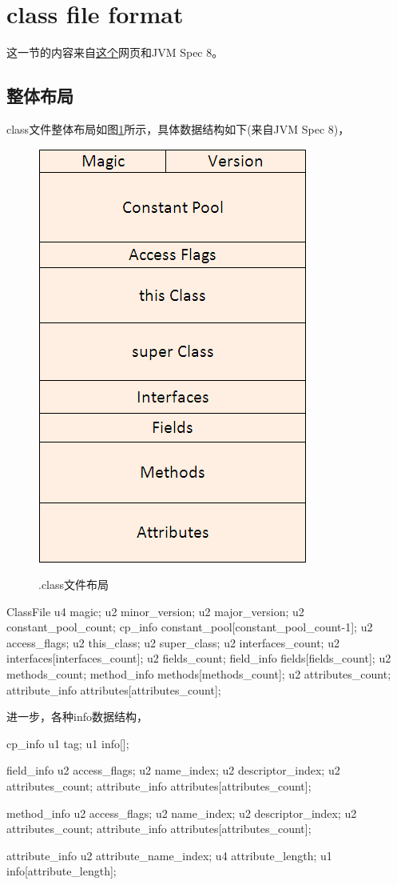 \section[class file format]{class file format}
这一节的内容来自\href{http://hxraid.iteye.com/blog/687660}{这个}网页和JVM Spec 8。

\subsection[整体布局]{整体布局}
class文件整体布局如图\ref{fig:dotclass}所示，具体数据结构如下(来自JVM Spec 8)，

\begin{figure}
  \centering
  \includegraphics[width=.4\textwidth]{picturedir/JavaClassFileLayout.png}\\
  \caption{.class文件布局}\label{fig:dotclass}
\end{figure}

\begin{javacode}
ClassFile {
  u4 magic;
  u2 minor_version;
  u2 major_version;
  u2 constant_pool_count;
  cp_info constant_pool[constant_pool_count-1];
  u2 access_flags;
  u2 this_class;
  u2 super_class;
  u2 interfaces_count;
  u2 interfaces[interfaces_count];
  u2 fields_count;
  field_info fields[fields_count];
  u2 methods_count;
  method_info methods[methods_count];
  u2 attributes_count;
  attribute_info attributes[attributes_count];
}
\end{javacode}

进一步，各种info数据结构，

\begin{javacode}
cp_info {
  u1 tag;
  u1 info[];
}

field_info {
  u2 access_flags;
  u2 name_index;
  u2 descriptor_index;
  u2 attributes_count;
  attribute_info attributes[attributes_count];
}

method_info {
  u2 access_flags;
  u2 name_index;
  u2 descriptor_index;
  u2 attributes_count;
  attribute_info attributes[attributes_count];
}

attribute_info {
  u2 attribute_name_index;
  u4 attribute_length;
  u1 info[attribute_length];
}
\end{javacode}

